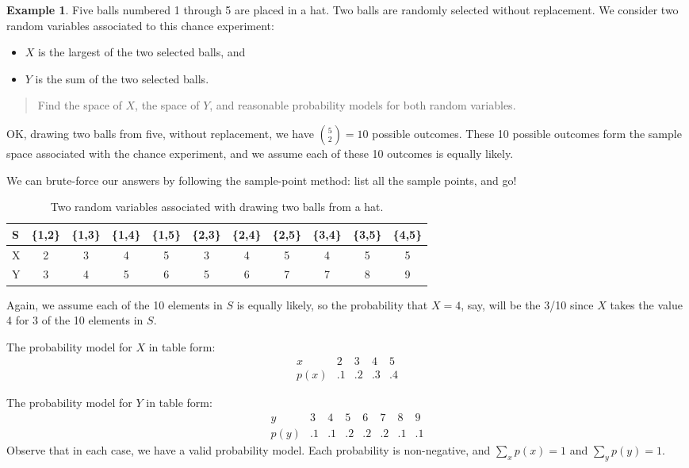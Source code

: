 \documentclass[
]{book}
\providecommand{\tightlist}{%
  \setlength{\itemsep}{0pt}\setlength{\parskip}{0pt}}
\theoremstyle{definition}
\theoremstyle{definition}
\newtheorem{example}{Example}[chapter]
\theoremstyle{definition}
\theoremstyle{definition}
\theoremstyle{remark}
\begin{document}
\begin{example}
\protect\hypertarget{exm:draw-2-balls}{}\label{exm:draw-2-balls}Five balls numbered 1 through 5 are placed in a hat. Two balls are randomly selected without replacement. We consider two random variables associated to this chance experiment:

\begin{itemize}
\tightlist
\item
  \(X\) is the largest of the two selected balls, and
\item
  \(Y\) is the sum of the two selected balls.
\end{itemize}

\begin{quote}
Find the space of \(X\), the space of \(Y\), and reasonable probability models for both random variables.
\end{quote}

OK, drawing two balls from five, without replacement, we have \(\binom{5}{2} = 10\) possible outcomes. These 10 possible outcomes form the sample space associated with the chance experiment, and we assume each of these 10 outcomes is equally likely.

We can brute-force our answers by following the sample-point method: list all the sample points, and go!

\begin{table}[!h]
\centering
\caption{\label{tab:balls-from-hat-rv}Two random variables associated with drawing two balls from a hat.}
\centering
\begin{tabular}[t]{>{}l||c|c|c|c|c|c|c|c|c|c}
\hline
S & \{1,2\} & \{1,3\} & \{1,4\} & \{1,5\} & \{2,3\} & \{2,4\} & \{2,5\} & \{3,4\} & \{3,5\} & \{4,5\}\\
\hline
X & 2 & 3 & 4 & 5 & 3 & 4 & 5 & 4 & 5 & 5\\
\hline
Y & 3 & 4 & 5 & 6 & 5 & 6 & 7 & 7 & 8 & 9\\
\hline
\end{tabular}
\end{table}

Again, we assume each of the 10 elements in \(S\) is equally likely, so the probability that \(X = 4\), say, will be the 3/10 since \(X\) takes the value 4 for 3 of the 10 elements in \(S\).

The probability model for \(X\) in table form:
\[
\begin{array}{c|c|c|c|c}
x    &  2 &  3 &  4 &  5 \\ \hline
p(x) & .1 & .2 & .3 & .4 
\end{array}
\]

The probability model for \(Y\) in table form:
\[
\begin{array}{c|c|c|c|c|c|c|c}
y & 3 & 4 & 5 & 6 & 7 & 8 & 9\\ \hline
p(y) & .1 & .1 & .2 & .2 & .2 &.1 & .1 
\end{array}
\]
Observe that in each case, we have a valid probability model. Each probability is non-negative, and \(\sum_x p(x) = 1\) and \(\sum_y p(y) = 1\).
\end{example}
\end{document}

